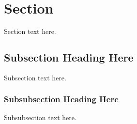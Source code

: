 \section{Section}

Section text here. 

\subsection{Subsection Heading Here}
Subsection text here.

\subsubsection{Subsubsection Heading Here}
Subsubsection text here.


